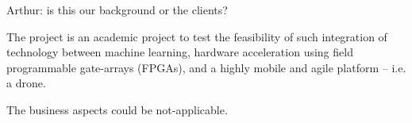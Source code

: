 Arthur: is this our background or the clients?

The project is an academic project to test the feasibility of such integration
of technology between machine learning, hardware acceleration using field programmable
gate-arrays (FPGAs), and a highly mobile and agile platform -- i.e. a drone.

The business aspects could be not-applicable.